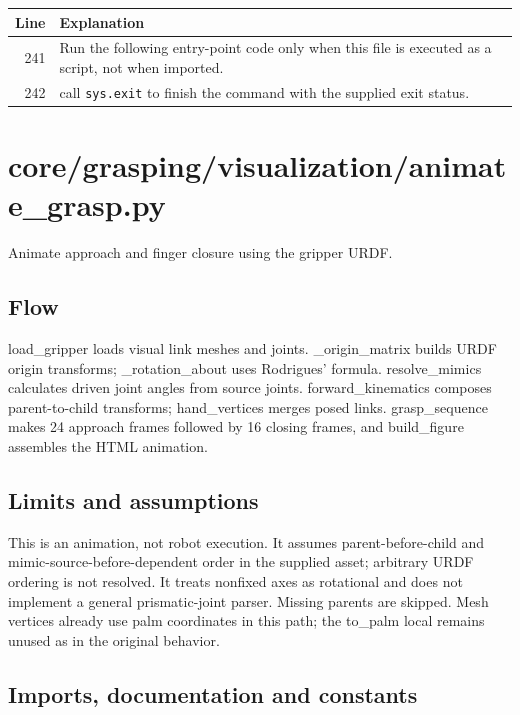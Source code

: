 \documentclass[11pt,a4paper]{book}
\begin{document}
\begin{longtable}{r p{}}

\textbf{Line} & \textbf{Explanation} \\ \hline \endhead

241 & Run the following entry-point code only when this file is executed as a script, not when imported. \\

242 & call \texttt{sys.exit} to finish the command with the supplied exit status. \\

\end{longtable}

\chapter{core/grasping/visualization/animate\_grasp.py}

Animate approach and finger closure using the gripper URDF.

\section*{Flow}

load\_gripper loads visual link meshes and joints. \_origin\_matrix builds URDF origin transforms; \_rotation\_about uses Rodrigues' formula. resolve\_mimics calculates driven joint angles from source joints. forward\_kinematics composes parent-to-child transforms; hand\_vertices merges posed links. grasp\_sequence makes 24 approach frames followed by 16 closing frames, and build\_figure assembles the HTML animation.

\section*{Limits and assumptions}

This is an animation, not robot execution. It assumes parent-before-child and mimic-source-before-dependent order in the supplied asset; arbitrary URDF ordering is not resolved. It treats nonfixed axes as rotational and does not implement a general prismatic-joint parser. Missing parents are skipped. Mesh vertices already use palm coordinates in this path; the to\_palm local remains unused as in the original behavior.

\section{Imports, documentation and constants}
\end{document}
